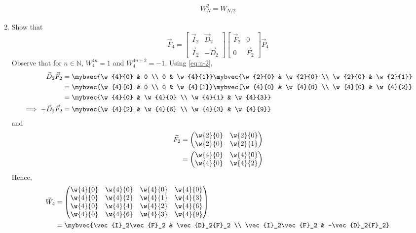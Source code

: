 \documentclass[journal,12pt,twocolumn]{IEEEtran}
\newcommand{\myvec}[1]{\ensuremath{\begin{pmatrix}#1\end{pmatrix}}}
\renewcommand\thesection{\arabic{section}}
\begin{document}
\begin{enumerate}[label=\thesection.\arabic*]
\begin{align}
     W_{N}^{2}=W_{N/2}
\end{align}
\item Show that 
\begin{equation}
	\vec{F}_{4}=
\begin{bmatrix}
	\vec{I}_{2} & \vec{D}_{2} \\
\vec{I}_{2} & -\vec{D}_{2}
\end{bmatrix}
\begin{bmatrix}
\vec{F}_{2} & 0 \\
0 & \vec{F}_{2}
\end{bmatrix}
\vec{P}_{4}
\label{eq:fft-recurrence}
\end{equation}
\solution Observe that for $n \in \mathbb{N}$, $W_4^{4n} = 1$ and $W_4^{4n + 2} = -1$. Using \eqref{eq:n-2},
\begin{align}
	\vec{D}_2\vec{F}_2 &= \mybvec{\w{4}{0} & 0 \\ 0 & \w{4}{1}}\mybvec{\w{2}{0} & \w{2}{0} \\ \w{2}{0} & \w{2}{1}} \\
					   &= \mybvec{\w{4}{0} & 0 \\ 0 & \w{4}{1}}\mybvec{\w{4}{0} & \w{4}{0} \\ \w{4}{0} & \w{4}{2}} \\
					   &= \mybvec{\w{4}{0} & \w{4}{0} \\ \w{4}{1} & \w{4}{3}} \label{eq:fft-df1} \\
	\implies -\vec{D}_2\vec{F}_2 &= \mybvec{\w{4}{2} & \w{4}{6} \\ \w{4}{3} & \w{4}{9}} \label{eq:fft-df2}
\end{align}
and
\begin{align}
	\vec{F}_2 &= \myvec{\w{2}{0} & \w{2}{0} \\ \w{2}{0} & \w{2}{1}} \\
			  &= \myvec{\w{4}{0} & \w{4}{0} \\ \w{4}{0} & \w{4}{2}}
\end{align}
Hence,
\begin{align}
	\vec{W}_4 &= \myvec{\w{4}{0} & \w{4}{0} & \w{4}{0} & \w{4}{0} \\
		\w{4}{0} & \w{4}{2} & \w{4}{1} & \w{4}{3} \\
		\w{4}{0} & \w{4}{4} & \w{4}{2} & \w{4}{6} \\
		\w{4}{0} & \w{4}{6} & \w{4}{3} & \w{4}{9} 
	} \label{eq:fft-permutation} \\
	&= \mybvec{\vec{I}_2\vec{F}_2 & \vec{D}_2{F}_2 \\ \vec{I}_2\vec{F}_2 & -\vec{D}_2{F}_2} \\

\end{align}
\end{enumerate}
\end{document}
